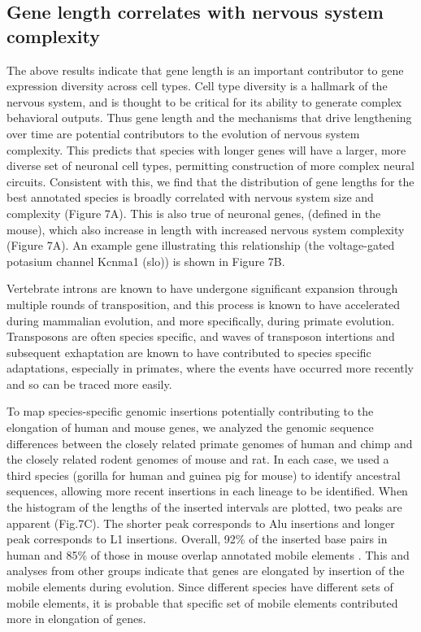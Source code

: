 \subsection{Gene length correlates with nervous system complexity}

The above results indicate that gene length is an important contributor to gene expression diversity across cell types. Cell type diversity is a hallmark of the nervous system, and is thought to be critical for its ability to generate complex behavioral outputs. Thus gene length and the mechanisms that drive lengthening over time are potential contributors to the evolution of nervous system complexity. This predicts that species with longer genes will have a larger, more diverse set of neuronal cell types, permitting construction of more complex neural circuits. Consistent with this, we find that the distribution of gene lengths for the best annotated species is broadly correlated with nervous system size and complexity (Figure 7A). This is also true of neuronal genes, (defined in the mouse), which also increase in length with increased nervous system complexity (Figure 7A). An example gene illustrating this relationship (the voltage-gated potasium channel Kcnma1 (slo)) is shown in Figure 7B. 

Vertebrate introns are known to have undergone significant expansion through multiple rounds of transposition, and this process is known to have accelerated during mammalian evolution, and more specifically, during primate evolution\cite{Friedli_2015}. Transposons are often species specific, and waves of transposon intertions and subsequent exhaptation are known to have contributed to species specific adaptations\cite{Villar_2015}\cite{Mita_2016}\cite{Imbeault_2017}\cite{Chuong_2016a}, especially in primates\cite{Ward_2013}\cite{Han_2007}, where the events have occurred more recently and so can be traced more easily. 

To map species-specific genomic insertions potentially contributing to the elongation of human and mouse genes, we analyzed the genomic sequence differences between the closely related primate genomes of human and chimp and the closely related rodent genomes of mouse and rat. In each case, we used a third species (gorilla for human and guinea pig for mouse) to identify ancestral sequences, allowing more recent insertions in each lineage to be identified. When the histogram of the lengths of the inserted intervals are plotted, two peaks are apparent (Fig.7C). The shorter peak corresponds to Alu insertions and longer peak corresponds to L1 insertions. Overall, 92\% of the inserted base pairs in human and 85\% of those in mouse overlap annotated mobile elements \cite{Hubley_2015}. This and analyses from other groups \cite{Grishkevich_2014} indicate that genes are elongated by insertion of the mobile elements during evolution. Since different species have different sets of mobile elements, it is probable that specific set of mobile elements contributed more in elongation of genes.

